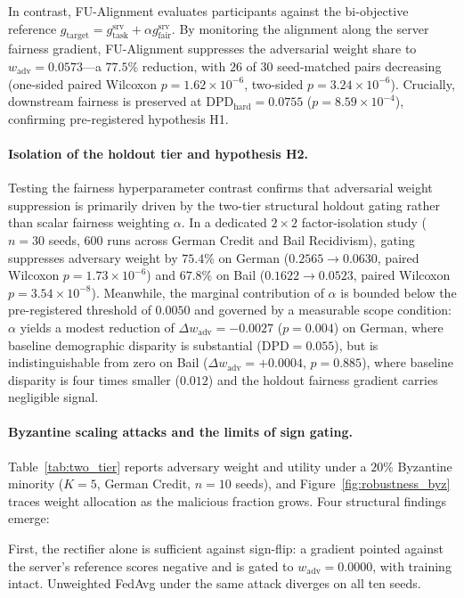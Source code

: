 \documentclass[preprint,12pt]{elsarticle}
\theoremstyle{plain}
\theoremstyle{definition}
\theoremstyle{remark}
\begin{document}
In contrast, FU-Alignment evaluates participants against the bi-objective reference $g_{\mathrm{target}} = g_{\mathrm{task}}^{\mathrm{srv}} + \alpha g_{\mathrm{fair}}^{\mathrm{srv}}$. By monitoring the alignment along the server fairness gradient, FU-Alignment suppresses the adversarial weight share to $w_{\mathrm{adv}} = 0.0573$---a $77.5\%$ reduction, with $26$ of $30$ seed-matched pairs decreasing (one-sided paired Wilcoxon $p = 1.62 \times 10^{-6}$, two-sided $p = 3.24 \times 10^{-6}$). Crucially, downstream fairness is preserved at $\mathrm{DPD}_{\mathrm{hard}} = 0.0755$ ($p = 8.59 \times 10^{-4}$), confirming pre-registered hypothesis H1.

\paragraph{Isolation of the holdout tier and hypothesis H2.}
Testing the fairness hyperparameter contrast confirms that adversarial weight suppression is primarily driven by the two-tier structural holdout gating rather than scalar fairness weighting $\alpha$. In a dedicated $2\times2$ factor-isolation study ($n=30$ seeds, $600$ runs across German Credit and Bail Recidivism), gating suppresses adversary weight by $75.4\%$ on German ($0.2565 \to 0.0630$, paired Wilcoxon $p = 1.73\times 10^{-6}$) and $67.8\%$ on Bail ($0.1622 \to 0.0523$, paired Wilcoxon $p = 3.54\times 10^{-8}$). Meanwhile, the marginal contribution of $\alpha$ is bounded below the pre-registered threshold of $0.0050$ and governed by a measurable scope condition: $\alpha$ yields a modest reduction of $\Delta w_{\mathrm{adv}} = -0.0027$ ($p = 0.004$) on German, where baseline demographic disparity is substantial ($\mathrm{DPD} = 0.055$), but is indistinguishable from zero on Bail ($\Delta w_{\mathrm{adv}} = +0.0004$, $p = 0.885$), where baseline disparity is four times smaller ($0.012$) and the holdout fairness gradient carries negligible signal.

\paragraph{Byzantine scaling attacks and the limits of sign gating.}
Table~\ref{tab:two_tier} reports adversary weight and utility under a $20\%$ Byzantine minority ($K=5$, German Credit, $n=10$ seeds), and Figure~\ref{fig:robustness_byz} traces weight allocation as the malicious fraction grows. Four structural findings emerge:

First, the rectifier alone is sufficient against sign-flip: a gradient pointed against the server's reference scores negative and is gated to $w_{\mathrm{adv}} = 0.0000$, with training intact. Unweighted FedAvg under the same attack diverges on all ten seeds.
\end{document}
